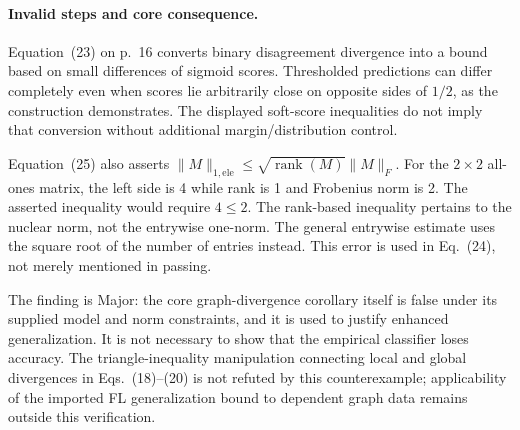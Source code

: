 \documentclass[10pt]{article}
\begin{document}
\paragraph*{Invalid steps and core consequence.}\mbox{}\par
Equation (23) on p. 16 converts binary disagreement divergence into a bound based on small differences of sigmoid scores. Thresholded predictions can differ completely even when scores lie arbitrarily close on opposite sides of \(1/2\), as the construction demonstrates. The displayed soft-score inequalities do not imply that conversion without additional margin/distribution control.\par
Equation (25) also asserts \(\|M\|_{1,\mathrm{ele}}\le\sqrt{\operatorname{rank}(M)}\|M\|_F\). For the \(2\times2\) all-ones matrix, the left side is 4 while rank is 1 and Frobenius norm is 2. The asserted inequality would require \(4\le2\). The rank-based inequality pertains to the nuclear norm, not the entrywise one-norm. The general entrywise estimate uses the square root of the number of entries instead. This error is used in Eq. (24), not merely mentioned in passing.\par
The finding is Major: the core graph-divergence corollary itself is false under its supplied model and norm constraints, and it is used to justify enhanced generalization. It is not necessary to show that the empirical classifier loses accuracy. The triangle-inequality manipulation connecting local and global divergences in Eqs. (18)–(20) is not refuted by this counterexample; applicability of the imported FL generalization bound to dependent graph data remains outside this verification.\par
\end{document}
